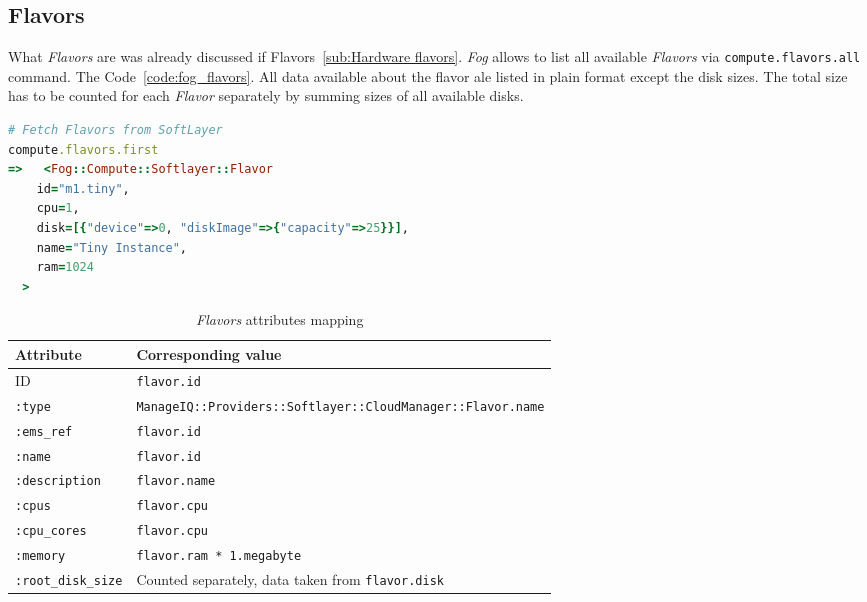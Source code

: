 \clearpage
\subsection{Flavors}
\label{sub:Flavors}

What \emph{Flavors} are was already discussed if Flavors~\ref{sub:Hardware flavors}. \emph{Fog} allows to list all available \emph{Flavors} via \texttt{compute.flavors.all} command. The Code~\ref{code:fog_flavors}. All data available about the flavor ale listed in plain format except the disk sizes. The total size has to be counted for each \emph{Flavor} separately by summing sizes of all available disks.

\begin{lstlisting}[language=Ruby,caption={Sample of \emph{Flavors} data},label=code:fog_flavors,float=htpb]
# Fetch Flavors from SoftLayer
compute.flavors.first
=>   <Fog::Compute::Softlayer::Flavor
    id="m1.tiny",
    cpu=1,
    disk=[{"device"=>0, "diskImage"=>{"capacity"=>25}}],
    name="Tiny Instance",
    ram=1024
  >
\end{lstlisting}

\begin{table}[ht]
	\centering
	\caption{\emph{Flavors} attributes mapping}\label{tab:Flavors attributes mapping}
	\begin{tabular}{ll}
		\toprule
		Attribute                  & Corresponding value                                                      \\
		\midrule
		ID                         & \texttt{flavor.id}                                                       \\
		\texttt{:type}             & \small\texttt{ManageIQ::Providers::Softlayer::CloudManager::Flavor.name} \\
		\texttt{:ems\_ref}         & \texttt{flavor.id}                                                       \\
		\texttt{:name}             & \texttt{flavor.id}                                                       \\
		\texttt{:description}      & \texttt{flavor.name}                                                     \\
		\texttt{:cpus}             & \texttt{flavor.cpu}                                                      \\
		\texttt{:cpu\_cores}       & \texttt{flavor.cpu}                                                      \\
		\texttt{:memory}           & \texttt{flavor.ram * 1.megabyte}                                         \\
		\texttt{:root\_disk\_size} & Counted separately, data taken from \texttt{flavor.disk}                 \\
		\bottomrule
	\end{tabular}
\end{table}

